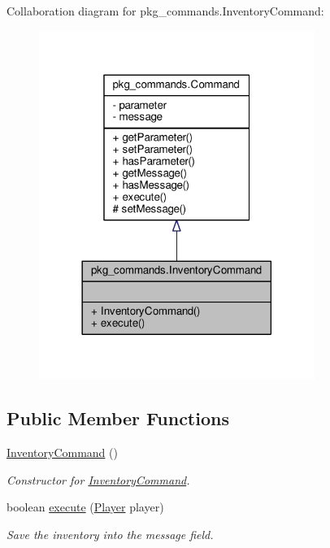 Collaboration diagram for pkg\-\_\-commands.\-Inventory\-Command\-:\nopagebreak
\begin{figure}[H]
\begin{center}
\leavevmode
\includegraphics[width=254pt]{classpkg__commands_1_1InventoryCommand__coll__graph}
\end{center}
\end{figure}
\subsection*{Public Member Functions}
\begin{DoxyCompactItemize}
\item 
\hyperlink{classpkg__commands_1_1InventoryCommand_a4ca959fe6979e5ca2a79a0596803533d}{Inventory\-Command} ()
\begin{DoxyCompactList}\small\item\em Constructor for \hyperlink{classpkg__commands_1_1InventoryCommand}{Inventory\-Command}. \end{DoxyCompactList}\item 
boolean \hyperlink{classpkg__commands_1_1InventoryCommand_a16ce9e3db461ecb7c4a50d2bdef65022}{execute} (\hyperlink{classpkg__world_1_1Player}{Player} player)
\begin{DoxyCompactList}\small\item\em Save the inventory into the message field. \end{DoxyCompactList}\end{DoxyCompactItemize}
